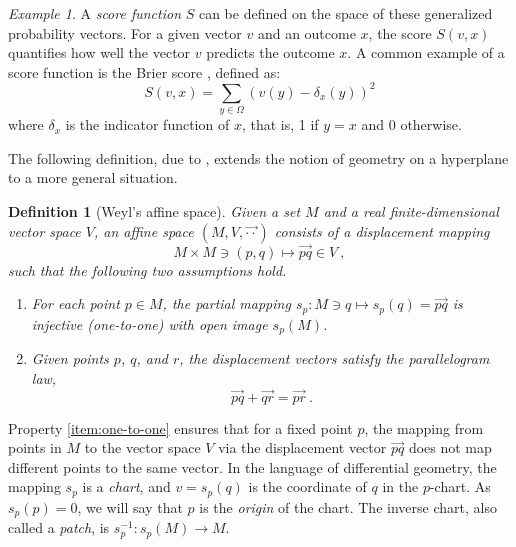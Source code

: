 \documentclass[axioms,article,submit,pdftex,moreauthors]{Definitions/mdpi}
\theoremstyle{plain}
\newtheorem{mydef}{Definition}
\theoremstyle{remark}
\newtheorem{myexample}{Example}
\begin{document}
\begin{myexample} \label{ex:Brier}
A \emph{score function} \( S \) can be defined on the space of these generalized probability vectors. For a given vector \( v \) and an outcome \( x \), the score \( S(v, x) \) quantifies how well the vector \( v \) predicts the outcome \( x \). A common example of a score function is the Brier score \cite{brier:1950VERIFICATIONOF}, defined as:
\begin{equation*} 
S(v, x) = \sum_{y \in \Omega} (v(y) - \delta_x(y))^2
\end{equation*} 
where \(\delta_x\) is the indicator function of $x$, that is, 1 if \( y = x \) and 0 otherwise. %
\end{myexample}

The following definition, due to \cite{weyl:1952}, extends the notion of geometry on a hyperplane to a more general situation.

\begin{mydef}[Weyl's affine space]
Given a set \( M \) and a real finite-dimensional vector space \( V \), an affine space \( (M, V, \overrightarrow{\cdot \cdot}) \) consists of a \emph{displacement mapping}
\begin{equation*}
M \times M \ni (p, q) \mapsto \overrightarrow{pq} \in V \ ,
\end{equation*}
such that the following two assumptions hold.
\begin{enumerate}
    \item\label{item:one-to-one} For each point \( p \in M \), the partial mapping \( s_p : M \ni q \mapsto s_p(q) = \overrightarrow{pq} \) is injective (one-to-one) with open image $s_p(M)$. 
    \item \label{item:Chasles} Given points $p$, $q$, and $r$, the displacement vectors satisfy the parallelogram law,
   \begin{equation*}
   \overrightarrow{pq} + \overrightarrow{qr} = \overrightarrow{pr} \ .
   \end{equation*}
   \end{enumerate}
\end{mydef}

Property \ref{item:one-to-one} ensures that for a fixed point \( p \), the mapping from points in \( M \) to the vector space \( V \) via the displacement vector \( \overrightarrow{pq} \) does not map different points to the same vector. In the language of differential geometry, the mapping $s_p$ is a \emph{chart}, and $v = s_p(q)$ is the coordinate of $q$ in the $p$-chart. As $s_p(p) = 0$, we will say that $p$ is the \emph{origin} of the chart. The inverse chart, also called a \emph{patch}, is $s^{-1}_p \colon s_p(M) \to M$.
\end{document}
